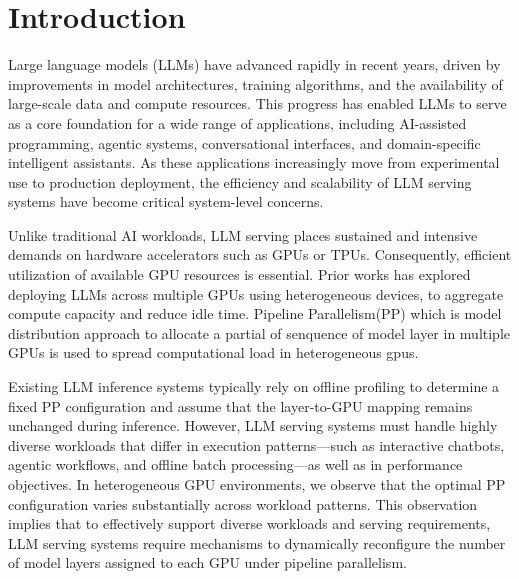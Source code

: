 \documentclass[sigplan,screen]{acmart}
\begin{document}


\maketitle

\section{Introduction}

Large language models (LLMs) have advanced rapidly in recent years, driven by improvements in model architectures, training algorithms, and the availability of large-scale data and compute resources. This progress has enabled LLMs to serve as a core foundation for a wide range of applications, including AI-assisted programming, agentic systems, conversational interfaces, and domain-specific intelligent assistants. As these applications increasingly move from experimental use to production deployment, the efficiency and scalability of LLM serving systems have become critical system-level concerns.

Unlike traditional AI workloads, LLM serving places sustained and intensive demands on hardware accelerators such as GPUs or TPUs. Consequently, efficient utilization of available GPU resources is essential. Prior works has explored deploying LLMs across multiple GPUs using heterogeneous devices, to aggregate compute capacity and reduce idle time. Pipeline Parallelism(PP) which is model distribution approach to allocate a partial of senquence of model layer in multiple GPUs is used to spread computational load in heterogeneous gpus.


Existing LLM inference systems typically rely on offline profiling to determine a fixed PP configuration and assume that the layer-to-GPU mapping remains unchanged during inference. However, LLM serving systems must handle highly diverse workloads that differ in execution patterns—such as interactive chatbots, agentic workflows, and offline batch processing—as well as in performance objectives. In heterogeneous GPU environments, we observe that the optimal PP configuration varies substantially across workload patterns. This observation implies that to effectively support diverse workloads and serving requirements, LLM serving systems require mechanisms to dynamically reconfigure the number of model layers assigned to each GPU under pipeline parallelism.
\end{document}
